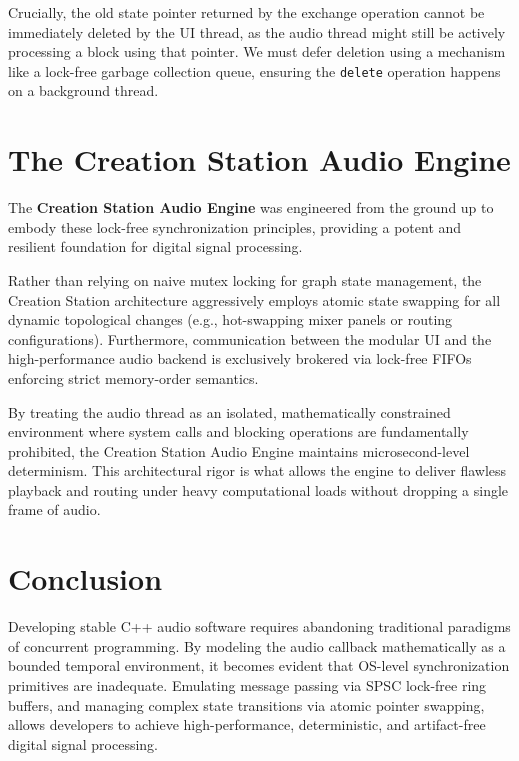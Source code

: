 \documentclass[11pt,a4paper]{article}
\begin{document}
Crucially, the old state pointer returned by the exchange operation cannot be immediately deleted by the UI thread, as the audio thread might still be actively processing a block using that pointer. We must defer deletion using a mechanism like a lock-free garbage collection queue, ensuring the \texttt{delete} operation happens on a background thread.

\section{The Creation Station Audio Engine}
The \textbf{Creation Station Audio Engine} was engineered from the ground up to embody these lock-free synchronization principles, providing a potent and resilient foundation for digital signal processing. 

Rather than relying on naive mutex locking for graph state management, the Creation Station architecture aggressively employs atomic state swapping for all dynamic topological changes (e.g., hot-swapping mixer panels or routing configurations). Furthermore, communication between the modular UI and the high-performance audio backend is exclusively brokered via lock-free FIFOs enforcing strict memory-order semantics. 

By treating the audio thread as an isolated, mathematically constrained environment where system calls and blocking operations are fundamentally prohibited, the Creation Station Audio Engine maintains microsecond-level determinism. This architectural rigor is what allows the engine to deliver flawless playback and routing under heavy computational loads without dropping a single frame of audio.

\section{Conclusion}
Developing stable C++ audio software requires abandoning traditional paradigms of concurrent programming. By modeling the audio callback mathematically as a bounded temporal environment, it becomes evident that OS-level synchronization primitives are inadequate. Emulating message passing via SPSC lock-free ring buffers, and managing complex state transitions via atomic pointer swapping, allows developers to achieve high-performance, deterministic, and artifact-free digital signal processing.
\end{document}
